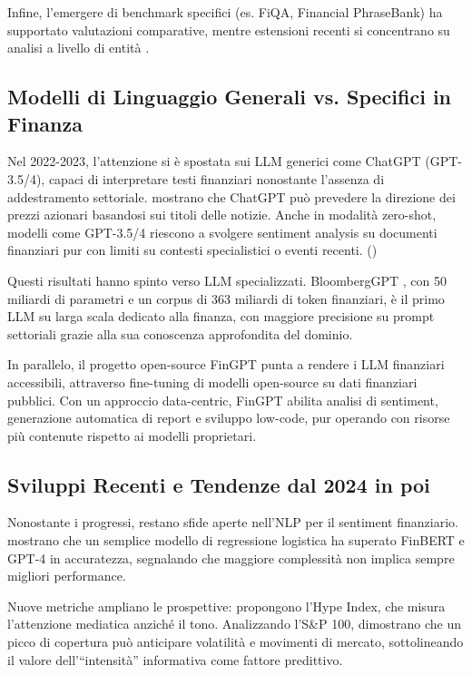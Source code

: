 \documentclass[a4paper,12pt]{article}
\begin{document}
Infine, l’emergere di benchmark specifici (es. FiQA, Financial PhraseBank) ha supportato valutazioni comparative, mentre estensioni recenti si concentrano su analisi a livello di entità \textcite{tang-etal-2023-finentity}.

\subsection{Modelli di Linguaggio Generali vs. Specifici in Finanza}

Nel 2022-2023, l’attenzione si è spostata sui LLM generici come ChatGPT (GPT-3.5/4), capaci di interpretare testi finanziari nonostante l’assenza di addestramento settoriale. \textcite{lopezlira2024chatgptforecaststockprice} mostrano che ChatGPT può prevedere la direzione dei prezzi azionari basandosi sui titoli delle notizie. Anche in modalità zero-shot, modelli come GPT-3.5/4 riescono a svolgere sentiment analysis su documenti finanziari pur con limiti su contesti specialistici o eventi recenti. (\textcite{bdcc8110143})

Questi risultati hanno spinto verso LLM specializzati. BloombergGPT \textcite{wu2023bloomberggptlargelanguagemodel}, con 50 miliardi di parametri e un corpus di 363 miliardi di token finanziari, è il primo LLM su larga scala dedicato alla finanza, con maggiore precisione su prompt settoriali grazie alla sua conoscenza approfondita del dominio.

In parallelo, il progetto open-source FinGPT \textcite{yang2023fingptopensourcefinanciallarge} punta a rendere i LLM finanziari accessibili, attraverso fine-tuning di modelli open-source su dati finanziari pubblici. Con un approccio data-centric, FinGPT abilita analisi di sentiment, generazione automatica di report e sviluppo low-code, pur operando con risorse più contenute rispetto ai modelli proprietari.

\subsection{Sviluppi Recenti e Tendenze dal 2024 in poi}

Nonostante i progressi, restano sfide aperte nell’NLP per il sentiment finanziario. \textcite{bdcc8110143} mostrano che un semplice modello di regressione logistica ha superato FinBERT e GPT-4 in accuratezza, segnalando che maggiore complessità non implica sempre migliori performance.

Nuove metriche ampliano le prospettive: \textcite{cao2025hypeindexnlpdrivenmeasure} propongono l’Hype Index, che misura l’attenzione mediatica anziché il tono. Analizzando l’S\&P 100, dimostrano che un picco di copertura può anticipare volatilità e movimenti di mercato, sottolineando il valore dell’“intensità” informativa come fattore predittivo.
\end{document}
